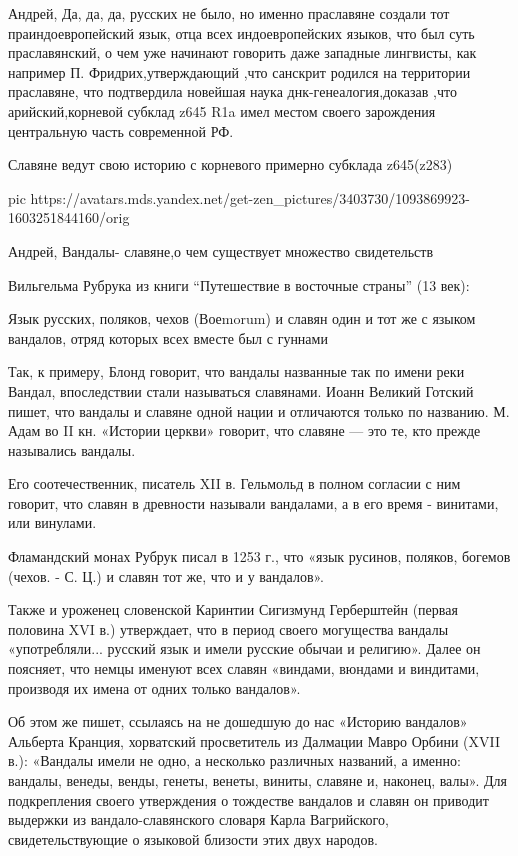 \begin{itemize}

Андрей, Да, да, да, русских не было, но именно праславяне создали тот
праиндоевропейский язык, отца всех индоевропейских языков, что был суть
праславянский, о чем уже начинают говорить даже западные лингвисты, как
например П. Фридрих,утверждающий ,что санскрит родился на территории
праславяне, что подтвердила новейшая наука днк-генеалогия,доказав ,что
арийский,корневой субклад z645 R1a имел местом своего зарождения центральную
часть современной РФ.

Славяне ведут свою историю с корневого примерно субклада z645(z283)

\ifcmt
  pic https://avatars.mds.yandex.net/get-zen_pictures/3403730/1093869923-1603251844160/orig
\fi


Андрей, Вандалы- славяне,о чем существует множество свидетельств

Вильгельма Рубрука из книги \enquote{Путешествие в восточные страны} (13 век):

Язык русских, поляков, чехов (Воеmorum) и славян один и тот же с языком
вандалов, отряд которых всех вместе был с гуннами

Так, к примеру, Блонд говорит, что вандалы названные так по имени реки Вандал,
впоследствии стали называться славянами. Иоанн Великий Готский пишет, что
вандалы и славяне одной нации и отличаются только по названию. М. Адам во II
кн. «Истории церкви» говорит, что славяне — это те, кто прежде назывались
вандалы.

Его соотечественник, писатель XII в. Гельмольд в полном согласии с ним говорит,
что славян в древности называли вандалами, а в его время - винитами, или
винулами.

Фламандский монах Рубрук писал в 1253 г., что «язык русинов, поляков, богемов
(чехов. - С. Ц.) и славян тот же, что и у вандалов».

Также и уроженец словенской Каринтии Сигизмунд Герберштейн (первая половина XVI
в.) утверждает, что в период своего могущества вандалы «употребляли... русский
язык и имели русские обычаи и религию». Далее он поясняет, что немцы именуют
всех славян «виндами, вюндами и виндитами, производя их имена от одних только
вандалов».

Об этом же пишет, ссылаясь на не дошедшую до нас «Историю вандалов» Альберта
Кранция, хорватский просветитель из Далмации Мавро Орбини (XVII в.): «Вандалы
имели не одно, а несколько различных названий, а именно: вандалы, венеды,
венды, генеты, венеты, виниты, славяне и, наконец, валы». Для подкрепления
своего утверждения о тождестве вандалов и славян он приводит выдержки из
вандало-славянского словаря Карла Вагрийского, свидетельствующие о языковой
близости этих двух народов.


\end{itemize}
